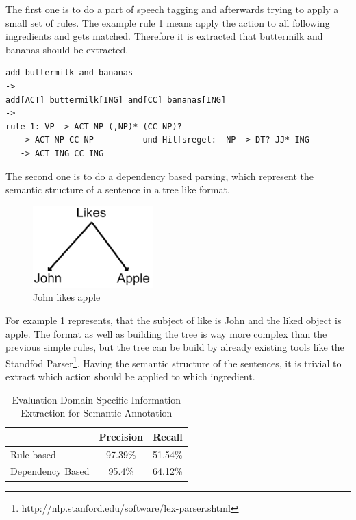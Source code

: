 \documentclass[12pt, twoside]{report}
\begin{document}
The first one is to do a part of speech tagging and afterwards trying to apply a small set of rules. The example rule 1 means apply the action to all following ingredients and gets matched. Therefore it is extracted that buttermilk and bananas should be extracted.

\begin{lstlisting}[frame=single, basicstyle=\footnotesize\ttfamily,caption={Rule based example}, label=lst:ruleBased]
add buttermilk and bananas
->
add[ACT] buttermilk[ING] and[CC] bananas[ING]
->
rule 1: VP -> ACT NP (,NP)* (CC NP)?
   -> ACT NP CC NP			und Hilfsregel:  NP -> DT? JJ* ING
   -> ACT ING CC ING

\end{lstlisting}

The second one is to do a dependency based parsing, which represent the semantic structure of a sentence in a tree like format.

\begin{figure}[h]
	\centering
	\includegraphics[]{Images/JohnLikesApple}
	\caption{John likes apple \parencite{GrammaBased}}
	\label{fig:johnLikesApple}
\end{figure}

For example \cref{fig:johnLikesApple} represents, that the subject of like is John and the liked object is apple.
The format as well as building the tree is way more complex than the previous simple rules, but the tree can be build by already existing tools like the Standfod Parser\footnote{http://nlp.stanford.edu/software/lex-parser.shtml}. Having the semantic structure of the sentences, it is trivial to extract which action should be applied to which ingredient.

\begin{table}
\centering
\begin{tabular}{ l | c | r } 
	  & Precision & Recall \\
	\hline
	Rule based & 97.39\% & 51.54\% \\
	Dependency Based & 95.4\% & 64.12\% \\
\end{tabular}
\label{table:masterEval}
\caption{Evaluation Domain Specific Information Extraction for Semantic Annotation}
\end{table}
\end{document}
